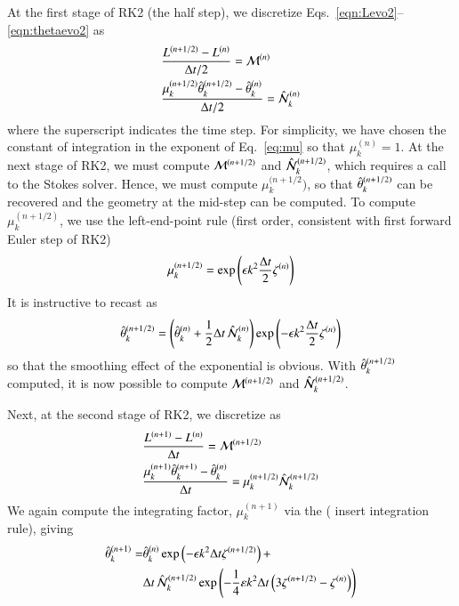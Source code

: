 \documentclass[preprint, 10pt]{elsarticle}
\begin{document}
At the first stage of RK2 (the half step), we discretize Eqs.~\eqref{eqn:Levo2}--\eqref{eqn:thetaevo2} as
\begin{align}
\label{eq:L12}
& \frac{L^{(n+1/2)} - L^{(n)}}{\Delta t/2} = \mathcal{M}^{(n)} \\
& \frac{ \mu_k^{(n+1/2)} \hat{\theta}_k^{(n+1/2)} - \hat{\theta}_k^{(n)}}{\Delta t/2} = \hat{\mathcal{N}}_k^{(n)}
\end{align}
where the superscript indicates the time step. For simplicity, we have chosen the constant of integration in the exponent of Eq.~\eqref{eq:mu} so that $\mu_k^{(n)} = 1$. At the next stage of RK2, we must compute $\mathcal{M}^{(n+1/2)}$ and $\hat{\mathcal{N}}_k^{(n+1/2)}$, which requires a call to the Stokes solver. Hence, we must compute $\mu_k^{(n+1/2})$, so that $\hat{\theta}_k^{(n+1/2)}$ can be recovered and the geometry at the mid-step can be computed. To compute $\mu_k^{(n+1/2)}$, we use the left-end-point rule (first order, consistent with first forward Euler step of RK2)
\begin{equation}
\mu_k^{(n+1/2)} = \exp \left( \epsilon k^2 \frac{\Delta t}{2} \zeta^{(n)}\right)
\end{equation}
It is instructive to recast as
\begin{equation}
\hat{\theta}_k^{(n+1/2)} = \left( \hat{\theta}_k^{(n)} + \frac{1}{2} \Delta t \, \hat{\mathcal{N}}_k^{(n)} \right)
\exp \left( -\epsilon k^2 \frac{\Delta t}{2} \zeta^{(n)}\right)
\end{equation}
so that the smoothing effect of the exponential is obvious. With $\hat{\theta}_k^{(n+1/2)}$ computed, it is now possible to compute $\mathcal{M}^{(n+1/2)}$ and $\hat{\mathcal{N}}_k^{(n+1/2)}$.

Next, at the second stage of RK2, we discretize as
\begin{align}
& \frac{L^{(n+1)} - L^{(n)}}{\Delta t} = \mathcal{M}^{(n+1/2)} \\
& \frac{ \mu_k^{(n+1)} \hat{\theta}_k^{(n+1)} - \hat{\theta}_k^{(n)}}{\Delta t} = \mu_k^{(n+1/2)} \hat{\mathcal{N}}_k^{(n+1/2)}
\end{align}
We again compute the integrating factor, $\mu_k^{(n+1)}$ via the ( insert integration rule), giving
\begin{align}
\hat{\theta}_k^{(n+1)} = 
& \hat{\theta}_k^{(n)}
\exp \left( - \epsilon k^2 \Delta t \zeta^{(n+1/2)} \right) +  \\
& \Delta t \, \hat{\mathcal{N}}_k^{(n+1/2)}
\exp \left( - \frac{1}{4} \varepsilon k^2 \Delta t \left( 3 \zeta^{(n+1/2)} - \zeta^{(n)} \right) \right)
\end{align}
\end{document}
